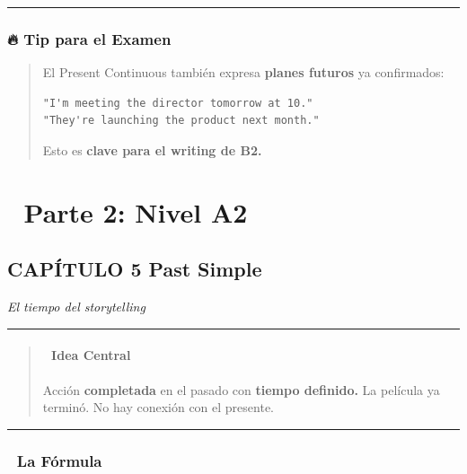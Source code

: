 \documentclass[
  spanish,
  letterpaper,
]{scrbook}
\begin{document}
\begin{center}\rule{0.5\linewidth}{0.5pt}\end{center}

\section{🔥 Tip para el Examen}\label{tip-para-el-examen-1}

\begin{quote}
El Present Continuous también expresa \textbf{planes futuros} ya
confirmados:

\begin{verbatim}
"I'm meeting the director tomorrow at 10."
"They're launching the product next month."
\end{verbatim}

Esto es \textbf{clave para el writing de B2.}
\end{quote}

\part{📗 Parte 2: Nivel A2}

\chapter{CAPÍTULO 5 Past Simple}\label{capuxedtulo-5-past-simple}

\emph{El tiempo del storytelling}

\begin{center}\rule{0.5\linewidth}{0.5pt}\end{center}

\begin{quote}
\subsection{🎯 Idea Central}\label{idea-central-3}

Acción \textbf{completada} en el pasado con \textbf{tiempo definido.} La
película ya terminó. No hay conexión con el presente.
\end{quote}

\begin{center}\rule{0.5\linewidth}{0.5pt}\end{center}

\section{📐 La Fórmula}\label{la-fuxf3rmula-1}
\end{document}
